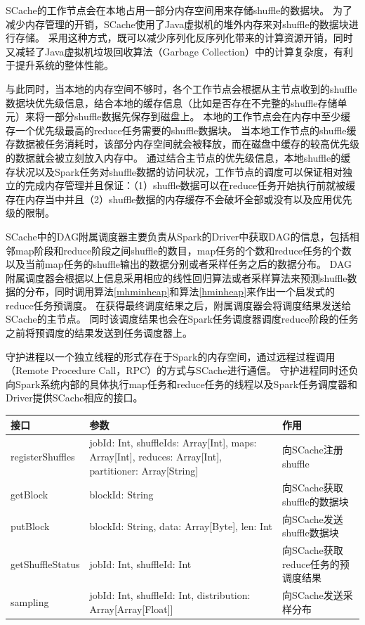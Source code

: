 SCache的工作节点会在本地占用一部分内存空间用来存储shuffle的数据块。
为了减少内存管理的开销，SCache使用了Java虚拟机的堆外内存来对shuffle的数据块进行存储。
采用这种方式，既可以减少序列化反序列化带来的计算资源开销，同时又减轻了Java虚拟机垃圾回收算法（Garbage Collection）中的计算复杂度，有利于提升系统的整体性能。

与此同时，当本地的内存空间不够时，各个工作节点会根据从主节点收到的shuffle数据块优先级信息，结合本地的缓存信息（比如是否存在不完整的shuffle存储单元）来将一部分shuffle数据先保存到磁盘上。
本地的工作节点会在内存中至少缓存一个优先级最高的reduce任务需要的shuffle数据块。
当本地工作节点的shuffle缓存数据被任务消耗时，该部分内存空间就会被释放，而在磁盘中缓存的较高优先级的数据就会被立刻放入内存中。
通过结合主节点的优先级信息，本地shuffle的缓存状况以及Spark任务对shuffle数据的访问状况，工作节点的调度可以保证相对独立的完成内存管理并且保证：（1）shuffle数据可以在reduce任务开始执行前就被缓存在内存当中并且（2）shuffle数据的内存缓存不会破坏全部或没有以及应用优先级的限制。

SCache中的DAG附属调度器主要负责从Spark的Driver中获取DAG的信息，包括相邻map阶段和reduce阶段之间shuffle的数目，map任务的个数和reduce任务的个数以及当前map任务的shuffle输出的数据分别或者采样任务之后的数据分布。
DAG附属调度器会根据以上信息采用相应的线性回归算法或者采样算法来预测shuffle数据的分布，同时调用算法\ref{mhminheap}和算法\ref{hminheap}来作出一个启发式的reduce任务预调度。
在获得最终调度结果之后，附属调度器会将调度结果发送给SCache的主节点。
同时该调度结果也会在Spark任务调度器调度reduce阶段的任务之前将预调度的结果发送到任务调度器上。

守护进程以一个独立线程的形式存在于Spark的内存空间，通过远程过程调用（Remote Procedure Call，RPC）的方式与SCache进行通信。
守护进程同时还负向Spark系统内部的具体执行map任务和reduce任务的线程以及Spark任务调度器和Driver提供SCache相应的接口。

\begin{table}[!hpb]
    \centering
    \begin{tabular}{ | m{2.5cm} | m{9cm} | m{3.6cm} | }
        \hline
        接口 & 参数 & 作用 \\ [0.5ex]
        \hline
        \hline
        registerShuffles & jobId: Int, shuffleIds: Array[Int], maps: Array[Int], reduces: Array[Int], partitioner: Array[String] & 向SCache注册shuffle \\ \hline
        getBlock & blockId: String & 向SCache获取shuffle的数据块 \\ \hline
        putBlock & blockId: String, data: Array[Byte], len: Int & 向SCache发送shuffle数据块 \\ \hline
        getShuffleStatus & jobId: Int, shuffleId: Int & 向SCache获取reduce任务的预调度结果 \\ \hline
        sampling & jobId: Int, shuffleId: Int, distribution: Array[Array[Float]] & 向SCache发送采样分布 \\ 
        \hline
    \end{tabular}
\end{table}

